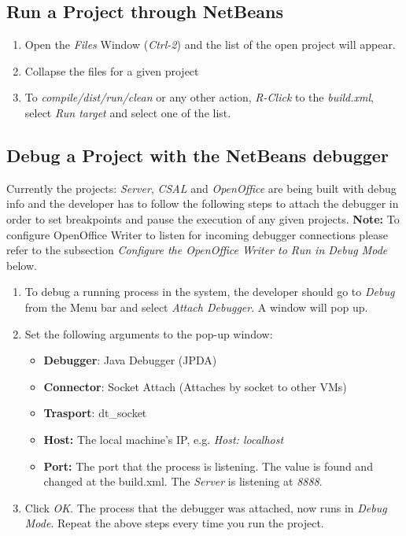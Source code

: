 \subsection{Run a Project through NetBeans}

\begin{enumerate}
  \item Open the \emph{Files} Window (\emph{Ctrl-2}) and the list of the open project will appear.
  \item Collapse the files for a given project
  \item To \emph{compile/dist/run/clean} or any other action, \emph{R-Click} to the \emph{build.xml}, select \emph{Run target} and select one of the list.
\end{enumerate}

\subsection{Debug a Project with the NetBeans debugger}
\label{sec:debug}
Currently the projects: \emph{Server}, \emph{CSAL} and \emph{OpenOffice} are
being built with debug info and the developer has to follow the following
steps to attach the debugger in order to set breakpoints and pause the
execution of any given projects.  \textbf{Note:} To configure OpenOffice Writer
  to listen for incoming debugger connections please refer to the subsection 
  \emph{Configure the OpenOffice Writer to Run in Debug Mode} below.

\begin{enumerate}
  \item To debug a running process in the system, the developer should go to \emph{Debug} from the Menu bar and select \emph{Attach Debugger}. A window will pop up.
  \item Set the following arguments to the pop-up window: 
  \begin{itemize}
    \item \textbf{Debugger}: Java Debugger (JPDA)
    \item \textbf{Connector}: Socket Attach (Attaches by socket to other VMs)
    \item \textbf{Trasport}: dt\_socket 
    \item \textbf{Host:} The local machine's IP, e.g. \emph{Host: localhost}
    \item \textbf{Port:} The port that the process is listening. The value is found and changed at the build.xml. The \emph{Server} is listening at \emph{8888}.
  \end{itemize}
  \item Click \emph{OK}. The process that the debugger was attached, now runs in \emph{Debug Mode}.
	Repeat the above steps every time you run the project.
\end{enumerate}
  

